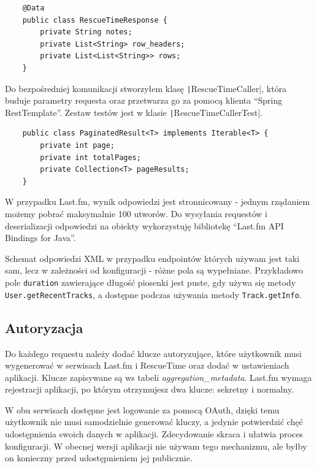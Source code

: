 \documentclass[openright]{xmgr}
\begin{document}
            \begin{verbatim}
    @Data
    public class RescueTimeResponse {
        private String notes;
        private List<String> row_headers;
        private List<List<String>> rows;
    }
            \end{verbatim}

            Do bezpośredniej komunikacji stworzyłem klasę \texttt|RescueTimeCaller|, która buduje parametry requesta
            oraz przetwarza go za pomocą klienta ``Spring RestTemplate''. Zestaw testów jest w klasie \texttt|RescueTimeCallerTest|.

            \begin{verbatim}
    public class PaginatedResult<T> implements Iterable<T> {
        private int page;
        private int totalPages;
        private Collection<T> pageResults;
    }
            \end{verbatim}

            W przypadku Last.fm, wynik odpowiedzi jest stronnicowany - jednym rządaniem możemy pobrać maksymalnie 100 utworów.
            Do wysyłania requestów i deserializacji odpowiedzi na obiekty
            wykorzystuję bibliotekę ``Last.fm API Bindings for Java''\cite{lastfm:java-bindings}.

            Schemat odpowiedzi XML w przypadku endpointów których używam jest taki sam, lecz w zależności od konfiguracji - różne pola są wypełniane.
            Przykładowo pole \verb|duration| zawierające długość piosenki jest puste, gdy używa się metody \verb|User.getRecentTracks|,
            a dostępne podczas używania metody \verb|Track.getInfo|.

        \subsection*{Autoryzacja}

        Do każdego requestu należy dodać klucze autoryzujące,
        które użytkownik musi wygenerować w serwisach Last.fm i RescueTime \cite{rescuetime:apidoc-keymanagment} oraz dodać w ustawieniach aplikacji.
        Klucze zapisywane są ws tabeli \textit{aggregation\_metadata}.
        Last.fm wymaga rejestracji aplikacji, po którym otrzymujesz dwa klucze: sekretny i normalny.

        W obu serwisach dostępne jest logowanie za pomocą OAuth, dzięki temu użytkownik nie musi samodzielnie generować kluczy,
        a jedynie potwierdzić chęć udostępnienia swoich danych w aplikacji. Zdecydowanie skraca i ułatwia proces konfiguracji.
        W obecnej wersji aplikacji nie używam tego mechanizmu, ale byłby on konieczny przed udostępnieniem jej publicznie.
\end{document}
